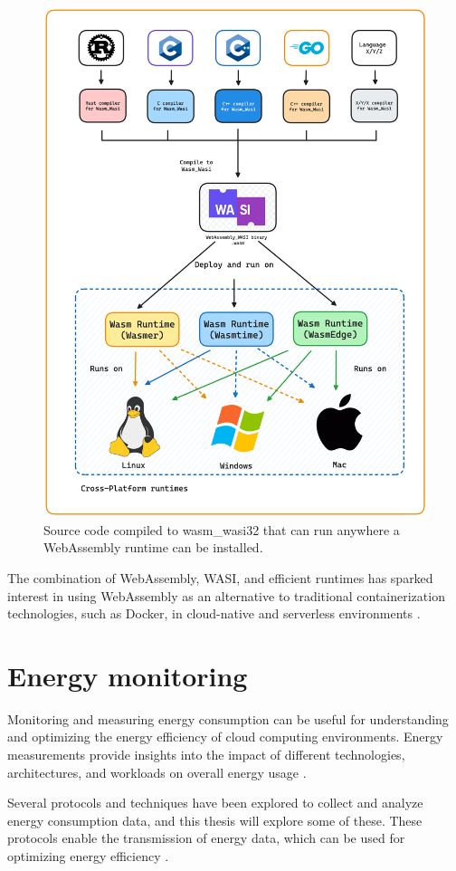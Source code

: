 \documentclass[
  table]{report}
\begin{document}
\begin{figure}[H]
\centering
  \includegraphics[width=0.7\columnwidth]{assets/3-wasm-runtime.png}
  \caption{Source code compiled to wasm\_wasi32 that can run anywhere
a WebAssembly runtime can be installed.}
  \label{fig:wasm-runtimes}
\end{figure}

The combination of WebAssembly, WASI, and efficient runtimes has sparked
interest in using WebAssembly as an alternative to traditional
containerization technologies, such as Docker, in cloud-native and
serverless environments \citep{shillakerFaasmLightweightIsolation2020a,
sebrechtsAdaptingKubernetesControllers2022}.

\section{Energy monitoring}

Monitoring and measuring energy consumption can be useful for
understanding and optimizing the energy efficiency of cloud computing
environments. Energy measurements provide insights into the impact of
different technologies, architectures, and workloads on overall energy
usage
\citep{shehabiUnitedStatesData2016, al-fuqahaInternetThingsSurvey2015}.

Several protocols and techniques have been explored to collect and
analyze energy consumption data, and this thesis will explore some of
these. These protocols enable the transmission of energy data, which can
be used for optimizing energy efficiency
\citep{al-fuqahaInternetThingsSurvey2015}.
\end{document}
